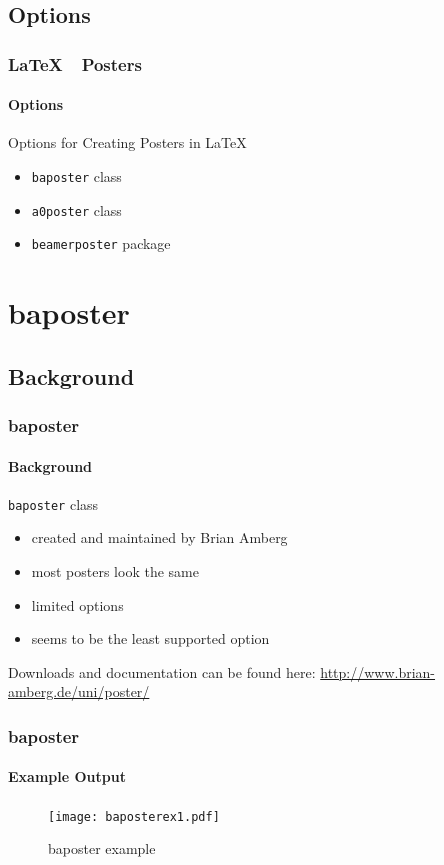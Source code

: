\documentclass[11pt]{beamer}
\renewcommand{\L}{\LaTeX\ }
\begin{document}
\subsection{Options}
\begin{frame}
\frametitle{\L\ Posters}\framesubtitle{Options}
Options for Creating Posters in \L
			\begin{itemize}
				\item \verb|baposter| class
				\item \verb|a0poster| class
				\item \verb|beamerposter| package
			\end{itemize}
\end{frame}

\section{baposter}
\subsection{Background}
\begin{frame}
\frametitle{baposter}\framesubtitle{Background}
	\verb|baposter| class
			\begin{itemize}
				\item created and maintained by Brian Amberg
				\item most posters look the same
				\item limited options
				\item seems to be the least supported option
			\end{itemize}
		Downloads and documentation can be found here:  \url{http://www.brian-amberg.de/uni/poster/}
\end{frame}

\begin{frame}
\frametitle{baposter}\framesubtitle{Example Output}
	\begin{figure}[htbp]
		\texttt{[image: baposterex1.pdf]}
		\caption{baposter example}
		\label{fig:baex1}
	\end{figure}
\end{frame}
\end{document}
